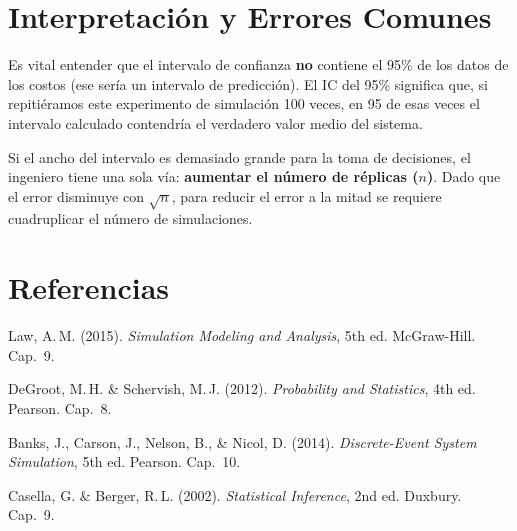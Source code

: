 \documentclass[11pt, letterpaper]{article}
\begin{document}
\section{Interpretación y Errores Comunes}
Es vital entender que el intervalo de confianza \textbf{no} contiene el 95\% de los datos de los costos (ese sería un intervalo de predicción). El IC del 95\% significa que, si repitiéramos este experimento de simulación 100 veces, en 95 de esas veces el intervalo calculado contendría el verdadero valor medio del sistema.

Si el ancho del intervalo es demasiado grande para la toma de decisiones, el ingeniero tiene una sola vía: \textbf{aumentar el número de réplicas ($n$)}. Dado que el error disminuye con $\sqrt{n}$, para reducir el error a la mitad se requiere cuadruplicar el número de simulaciones.

\section*{Referencias}
\begin{enumerate}[label={[\arabic*]}]
    \item Law, A.\,M. (2015). \textit{Simulation Modeling and Analysis}, 5th ed. McGraw-Hill. Cap.~9.
    \item DeGroot, M.\,H. \& Schervish, M.\,J. (2012). \textit{Probability and Statistics}, 4th ed. Pearson. Cap.~8.
    \item Banks, J., Carson, J., Nelson, B., \& Nicol, D. (2014). \textit{Discrete-Event System Simulation}, 5th ed. Pearson. Cap.~10.
    \item Casella, G. \& Berger, R.\,L. (2002). \textit{Statistical Inference}, 2nd ed. Duxbury. Cap.~9.
\end{enumerate}
\end{document}

